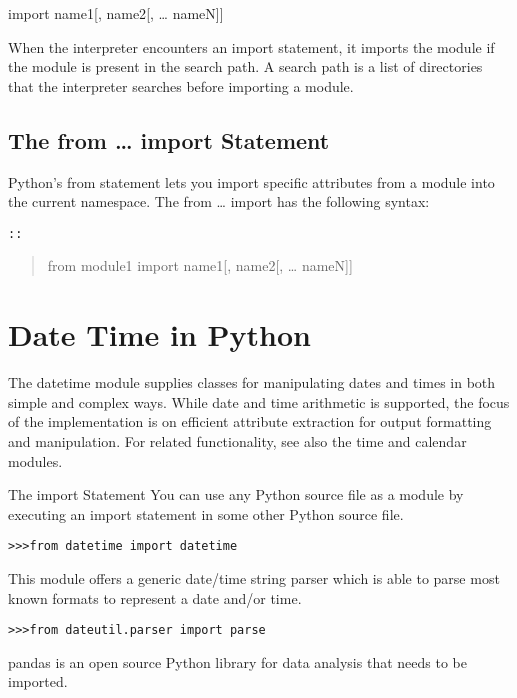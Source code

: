 import name1{[}, name2{[}, \ldots{} nameN{]}{]}

When the interpreter encounters an import statement, it imports the
module if the module is present in the search path. A search path is a
list of directories that the interpreter searches before importing a
module.

\subsection{The from \ldots{} import
Statement}\label{the-from-import-statement}

Python's from statement lets you import specific attributes from a
module into the current namespace. The from \ldots{} import has the
following syntax:

\begin{verbatim}
::
\end{verbatim}

\begin{quote}
from module1 import name1{[}, name2{[}, \ldots{} nameN{]}{]}
\end{quote}

\section{Date Time in Python}\label{date-time-in-python}

The datetime module supplies classes for manipulating dates and times in
both simple and complex ways. While date and time arithmetic is
supported, the focus of the implementation is on efficient attribute
extraction for output formatting and manipulation. For related
functionality, see also the time and calendar modules.

The import Statement You can use any Python source file as a module by
executing an import statement in some other Python source file.

\begin{verbatim}
>>>from datetime import datetime
\end{verbatim}

This module offers a generic date/time string parser which is able to
parse most known formats to represent a date and/or time.

\begin{verbatim}
>>>from dateutil.parser import parse
\end{verbatim}

pandas is an open source Python library for data analysis that needs to
be imported.

